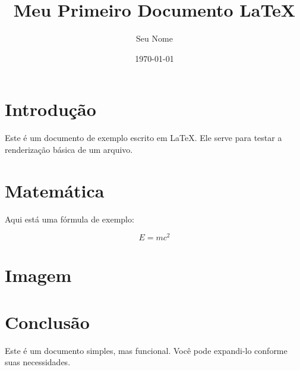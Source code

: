 \documentclass{article}
\title{Meu Primeiro Documento \LaTeX}
\author{Seu Nome}
\date{\today}
\begin{document}
\maketitle

\section{Introdução}
Este é um documento de exemplo escrito em \LaTeX. Ele serve para testar a renderização básica de um arquivo.

\section{Matemática}
Aqui está uma fórmula de exemplo:

\[
E = mc^2
\]

\section{Imagem}

\section{Conclusão}
Este é um documento simples, mas funcional. Você pode expandi-lo conforme suas necessidades.
\end{document}
